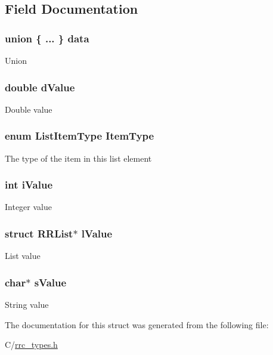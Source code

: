 \subsection{Field Documentation}
\hypertarget{struct_r_r_list_item_ac5bcd1de26b6efabd485bce48ecf8a8a}{
\subsubsection[{data}]{\setlength{\rightskip}{0pt plus 5cm}union \{ ... \}   data}}\label{struct_r_r_list_item_ac5bcd1de26b6efabd485bce48ecf8a8a}
Union \hypertarget{struct_r_r_list_item_ada9c8889b93084880c4bed9c9feeaa42}{
\subsubsection[{d\-Value}]{\setlength{\rightskip}{0pt plus 5cm}double d\-Value}}\label{struct_r_r_list_item_ada9c8889b93084880c4bed9c9feeaa42}
Double value \hypertarget{struct_r_r_list_item_a25c3073c0827a19b3ec0a0ea6d2ad5df}{
\subsubsection[{Item\-Type}]{\setlength{\rightskip}{0pt plus 5cm}enum {\bf List\-Item\-Type} Item\-Type}}\label{struct_r_r_list_item_a25c3073c0827a19b3ec0a0ea6d2ad5df}
The type of the item in this list element \hypertarget{struct_r_r_list_item_ac5de02e20d85842177a764866cef4ad2}{
\subsubsection[{i\-Value}]{\setlength{\rightskip}{0pt plus 5cm}int i\-Value}}\label{struct_r_r_list_item_ac5de02e20d85842177a764866cef4ad2}
Integer value \hypertarget{struct_r_r_list_item_afa0e0bc7c68d478c6819e82bedb5525f}{
\subsubsection[{l\-Value}]{\setlength{\rightskip}{0pt plus 5cm}struct {\bf R\-R\-List}$\ast$ l\-Value}}\label{struct_r_r_list_item_afa0e0bc7c68d478c6819e82bedb5525f}
List value \hypertarget{struct_r_r_list_item_a80e5abe988376805a91503e24e8d1efd}{
\subsubsection[{s\-Value}]{\setlength{\rightskip}{0pt plus 5cm}char$\ast$ s\-Value}}\label{struct_r_r_list_item_a80e5abe988376805a91503e24e8d1efd}
String value 

The documentation for this struct was generated from the following file\-:\begin{DoxyCompactItemize}
\item 
C/\hyperlink{rrc__types_8h}{rrc\-\_\-types.\-h}\end{DoxyCompactItemize}
